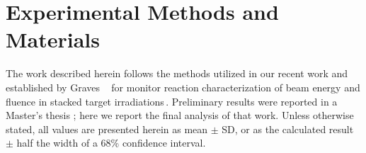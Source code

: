 % 



\section{\label{sec:experimental_U5_d}Experimental Methods and Materials}


The work described herein follows the  methods utilized in our recent work and established by Graves \etal\ 
for monitor reaction characterization of beam energy and fluence in stacked target irradiations\,\cite{Voyles2018a,Graves2016}.
% 
% 
% 
Preliminary results  were reported in a Master's thesis \cite{springer2017investigation}; here we report the final analysis of that work.
Unless otherwise stated, all values are presented herein as mean $\pm$ SD, or as the calculated result $\pm$ half the width of a 68\% confidence interval.



